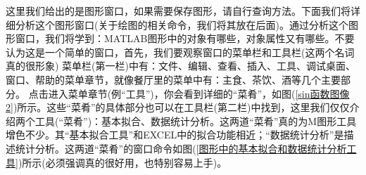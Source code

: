        \par
        这里我们给出的是图形窗口，如果需要保存图形，请自行查询方法。下面我们将详细分析这个图形窗口(关于绘图的相关命令，我们将其放在后面)。通过分析这个图形窗口，我们将学到：MATLAB图形中的对象有哪些，对象属性又有哪些。不要认为这是一个简单的窗口，首先，我们要观察窗口的菜单栏和工具栏(这两个名词真的很形象)
        菜单栏(第一栏)中有：文件、编辑、查看、插入、工具、调试桌面、窗口、帮助的菜单章节，就像餐厅里的菜单中有：主食、茶饮、酒等几个主要部分。
        点击进入菜单章节(例“工具”)，你会看到详细的“菜肴”，如图(\ref{sin函数图像2})所示。这些“菜肴”的具体部分也可以在工具栏(第二栏)中找到，这里我们仅仅介绍两个工具(“菜肴”)：基本拟合、数据统计分析。这两道“菜肴”真的为M图形工具增色不少。其“基本拟合工具”和EXCEL中的拟合功能相近；“数据统计分析”是描述统计分析。这两道“菜肴”的窗口命令如图(\ref{图形中的基本拟合和数据统计分析工具})所示(必须强调真的很好用，也特别容易上手)。
